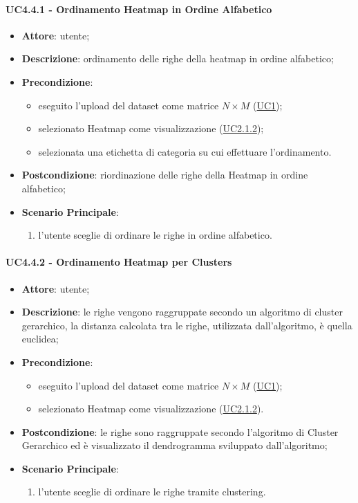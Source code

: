     \paragraph{UC4.4.1 - Ordinamento Heatmap in Ordine Alfabetico}
    \label{uc4.4.1}
    \begin{itemize}
    \item \textbf{Attore}: utente;
    \item \textbf{Descrizione}: ordinamento delle righe della heatmap in ordine alfabetico;
    \item \textbf{Precondizione}: 
    \begin{itemize}
        \item eseguito l'upload del dataset come matrice $N\times M$ (\hyperref[uc1]{UC1});
        \item selezionato Heatmap come visualizzazione (\hyperref[uc2.1.2]{UC2.1.2});
        \item selezionata una etichetta di categoria su cui effettuare l'ordinamento.
    \end{itemize}  
    \item \textbf{Postcondizione}: riordinazione delle righe della Heatmap in ordine alfabetico;
    \item \textbf{Scenario Principale}: 
    \begin{enumerate}
        \item l'utente sceglie di ordinare le righe in ordine alfabetico.
    \end{enumerate}  
    \end{itemize}
    
    \paragraph{UC4.4.2 - Ordinamento Heatmap per Clusters}
    \label{uc4.4.2}
    \begin{itemize}
    \item \textbf{Attore}: utente;
    \item \textbf{Descrizione}: le righe vengono raggruppate secondo un algoritmo di cluster gerarchico, la distanza calcolata  tra le righe, utilizzata dall'algoritmo, è quella euclidea;
    \item \textbf{Precondizione}: 
    \begin{itemize}
        \item eseguito l'upload del dataset come matrice $N\times M$ (\hyperref[uc1]{UC1});
        \item selezionato Heatmap come visualizzazione (\hyperref[uc2.1.2]{UC2.1.2}).
    \end{itemize}  
    \item \textbf{Postcondizione}: le righe sono raggruppate secondo l'algoritmo di Cluster Gerarchico ed è visualizzato il dendrogramma sviluppato dall'algoritmo;
    \item \textbf{Scenario Principale}: 
    \begin{enumerate}
        \item l'utente sceglie di ordinare le righe tramite clustering.
    \end{enumerate}  
    \end{itemize}
